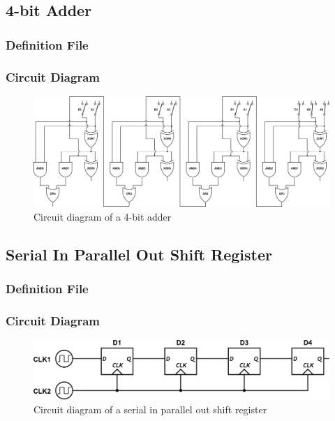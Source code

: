\documentclass[a4paper,10pt]{article}
\begin{document}
\subsection{4-bit Adder}

\subsubsection{Definition File}


\subsubsection{Circuit Diagram}
\begin{figure}[h]
 \centering
 \includegraphics[width=14cm]{../../examples/4-bit-adder.png}
 \caption{Circuit diagram of a 4-bit adder}
 \label{fig:example-adder}
\end{figure}

\subsection{Serial In Parallel Out Shift Register}

\subsubsection{Definition File}


\subsubsection{Circuit Diagram}
\begin{figure}[h]
 \centering
 \includegraphics[width=12cm]{../../examples/sipo.png}
 \caption{Circuit diagram of a serial in parallel out shift register}
 \label{fig:example-sipo}
\end{figure}
\end{document}

